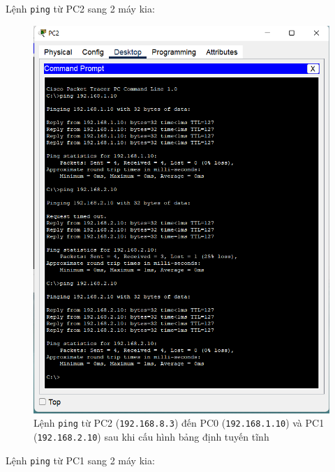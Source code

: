 \begin{enumerate}
Lệnh \texttt{ping} từ PC2 sang 2 máy kia:

\begin{figure}[H]
\begin{center}
\includegraphics[scale=1]{../figures/p1/p1-72}
\end{center}
\caption{Lệnh \texttt{ping} từ PC2 (\texttt{192.168.8.3}) đến PC0 (\texttt{192.168.1.10}) và PC1 (\texttt{192.168.2.10}) sau khi cấu hình bảng định tuyến tĩnh}
\end{figure}

Lệnh \texttt{ping} từ PC1 sang 2 máy kia:


\end{enumerate}
